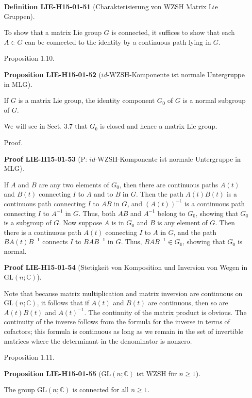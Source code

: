 \documentclass[10pt, letterpaper]{article}
\newcommand{\C}{\mathbb{C}}
\newcommand{\GL}{\mathrm{GL}}
\newcommand{\CustomHeading}[3]{%
  \par\medskip\noindent%
  \textbf{#1 #2} \textnormal{(#3)}.\enskip%
}
\newenvironment{DEF}[2]{\begin{unitbox}\CustomHeading{Definition}{#1}{#2}}{\end{unitbox}}
\newenvironment{PROP}[2]{\begin{unitbox}\CustomHeading{Proposition}{#1}{#2}}{\end{unitbox}}
\newenvironment{PROOF}[2]{\begin{unitbox}\CustomHeading{Proof}{#1}{#2}}{\end{unitbox}}
\begin{document}
\begin{DEF}{LIE-H15-01-51}{Charakterisierung von WZSH Matrix Lie Gruppen}
To show that a matrix Lie group $G$ is connected, it suffices to show that each $A \in G$ can be connected to the identity by a continuous path lying in $G$.
\end{DEF}

Proposition 1.10. 


\begin{PROP}{LIE-H15-01-52}{$id$-WZSH-Komponente ist normale Untergruppe in MLG}
If $G$ is a matrix Lie group, the identity component $G_{0}$ of $G$ is a normal subgroup of $G$.
\end{PROP}

We will see in Sect. 3.7 that $G_{0}$ is closed and hence a matrix Lie group.


Proof. 


\begin{PROOF}{LIE-H15-01-53}{P: $id$-WZSH-Komponente ist normale Untergruppe in MLG}
If $A$ and $B$ are any two elements of $G_{0}$, then there are continuous paths $A(t)$ and $B(t)$ connecting $I$ to $A$ and to $B$ in $G$. Then the path $A(t) B(t)$ is a continuous path connecting $I$ to $A B$ in $G$, and $(A(t))^{-1}$ is a continuous path connecting $I$ to $A^{-1}$ in $G$. Thus, both $A B$ and $A^{-1}$ belong to $G_{0}$, showing that $G_{0}$ is a subgroup of $G$. Now suppose $A$ is in $G_{0}$ and $B$ is any element of $G$. Then there is a continuous path $A(t)$ connecting $I$ to $A$ in $G$, and the path $B A(t) B^{-1}$ connects $I$ to $B A B^{-1}$ in $G$. Thus, $B A B^{-1} \in G_{0}$, showing that $G_{0}$ is normal.
\end{PROOF}

\begin{PROOF}{LIE-H15-01-54}{Stetigkeit von Komposition und Inversion von Wegen in $\GL(n;\C)$}
Note that because matrix multiplication and matrix inversion are continuous on $\mathrm{GL}(n ; \mathbb{C})$, it follows that if $A(t)$ and $B(t)$ are continuous, then so are $A(t) B(t)$ and $A(t)^{-1}$. The continuity of the matrix product is obvious. The continuity of the inverse follows from the formula for the inverse in terms of cofactors; this formula is continuous as long as we remain in the set of invertible matrices where the determinant in the denominator is nonzero.
\end{PROOF}

Proposition 1.11. 

\begin{PROP}{LIE-H15-01-55}{$\GL(n;\C)$ ist WZSH für $n\geq 1$}
The group $\mathrm{GL}(n ; \mathbb{C})$ is connected for all $n \geq 1$.
\end{PROP}
\end{document}
